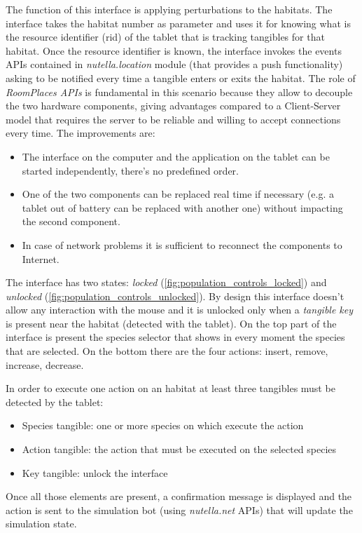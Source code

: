 The function of this interface is applying perturbations to the habitats. The interface takes the habitat number as parameter and uses it for knowing what is the resource identifier (rid) of the tablet that is tracking tangibles for that habitat. Once the resource identifier is known, the interface invokes the events APIs contained in \textit{nutella.location} module (that provides a push functionality) asking to be notified every time a tangible enters or exits the habitat. The role of \textit{RoomPlaces APIs} is fundamental in this scenario because they allow to decouple the two hardware components, giving advantages compared to a Client-Server model that requires the server to be reliable and willing to accept connections every time. The improvements are:
\begin{itemize}
    \item The interface on the computer and the application on the tablet can be started independently, there's no predefined order.
    \item One of the two components can be replaced real time if necessary (e.g. a tablet out of battery can be replaced with another one) without impacting the second component.
    \item In case of network problems it is sufficient to reconnect the components to Internet.
\end{itemize}

The interface has two states: \textit{locked} (\ref{fig:population_controls_locked}) and \textit{unlocked} (\ref{fig:population_controls_unlocked}). By design this interface doesn't allow any interaction with the mouse and it is unlocked only when a \textit{tangible key} is present near the habitat (detected with the tablet). On the top part of the interface is present the species selector that shows in every moment the species that are selected. On the bottom there are the four actions: insert, remove, increase, decrease. 

In order to execute one action on an habitat at least three tangibles must be detected by the tablet:
\begin{itemize}
    \item Species tangible: one or more species on which execute the action
    \item Action tangible: the action that must be executed on the selected species
    \item Key tangible: unlock the interface
\end{itemize}
Once all those elements are present, a confirmation message is displayed and the action is sent to the simulation bot (using \textit{nutella.net} APIs) that will update the simulation state.

